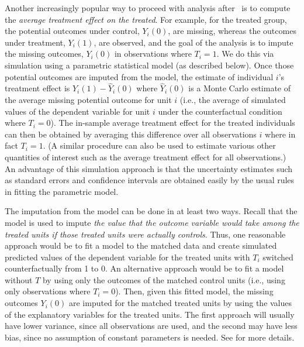 Another increasingly popular way to proceed with analysis after
\MatchIt\ is to compute the \emph{average treatment effect on the
  treated}.  For example, for the treated group, the potential
outcomes under control, $Y_i(0)$, are missing, whereas the outcomes
under treatment, $Y_i(1)$, are observed, and the goal of the analysis
is to impute the missing outcomes, $Y_i(0)$ in observations where
$T_i=1$.  We do this via simulation using a parametric statistical
model (as described below).  Once those potential outcomes are imputed
from the model, the estimate of individual $i$'s treatment effect is
$Y_i(1)-\widehat{Y}_i(0)$ where $\widehat{Y}_i(0)$ is a Monte Carlo
estimate of the average missing potential outcome for unit $i$ (i.e.,
the average of simulated values of the dependent variable for unit $i$
under the counterfactual condition where $T_i=0$).  The in-sample
average treatment effect for the treated individuals can then be
obtained by averaging this difference over all observations $i$ where
in fact $T_i=1$.  (A similar procedure can also be used to estimate
various other quantities of interest such as the average treatment
effect for all observations.)  An advantage of this simulation
approach is that the uncertainty estimates such as standard errors and
confidence intervals are obtained easily by the usual rules in fitting
the parametric model.

The imputation from the model can be done in at least two ways.
Recall that the model is used to impute \emph{the value that the
  outcome variable would take among the treated units if those treated
  units were actually controls}.  Thus, one reasonable approach would
be to fit a model to the matched data and create simulated predicted
values of the dependent variable for the treated units with $T_i$
switched counterfactually from 1 to 0.  An alternative approach would
be to fit a model without $T$ by using only the outcomes of the
matched control units (i.e., using only observations where $T_i=0$).
Then, given this fitted model, the missing outcomes $Y_i(0)$ are
imputed for the matched treated units by using the values of the
explanatory variables for the treated units.  The first approach will
usually have lower variance, since all observations are used, and the
second may have less bias, since no assumption of constant parameters
is needed.  See \citet*{HoImaKin06} for more details.

